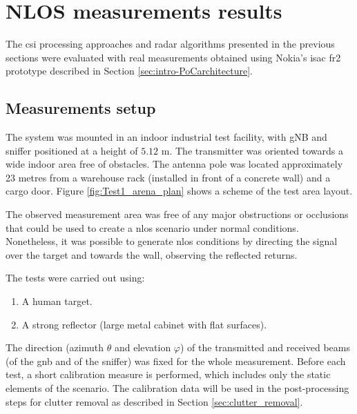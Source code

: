 \chapter{NLOS measurements results}

The \gls{csi} processing approaches and radar algorithms presented in the previous sections were evaluated with real measurements obtained using Nokia's \gls{isac} \gls{fr2} prototype described in Section \ref{sec:intro-PoCarchitecture}.

\section{Measurements setup}
\label{sec:Test1_meas_scenario}

The system was mounted in an indoor industrial test facility, with gNB and sniffer positioned at a height of $5.12$ m. The transmitter was oriented towards a wide  indoor area free of obstacles. The antenna pole was located approximately 23 metres from a warehouse rack (installed in front of a concrete wall) and a cargo door.
Figure \ref{fig:Test1_arena_plan} shows a scheme of the test area layout.

The observed measurement area was free of any major obstructions or occlusions that could be used to create a \gls{nlos} scenario under normal conditions.
Nonetheless, it was possible to generate \gls{nlos} conditions by directing the signal over the target and towards the wall, observing the reflected returns.

 
The tests were carried out using:

\begin{enumerate}
	\item A human target.
	\item A strong reflector (large metal cabinet with flat surfaces).
\end{enumerate}

The direction (azimuth $\theta$ and elevation $\varphi$) of the transmitted and received beams (\ie of the \gls{gnb} and of the sniffer) was fixed for the whole measurement.
Before each test, a short calibration measure is performed, which includes only the static elements of the scenario. The calibration data will be used in the post-processing steps for clutter removal as described in Section \ref{sec:clutter_removal}.

